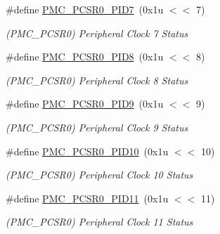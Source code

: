 \begin{DoxyCompactItemize}
\mbox{\label{group__SAMV71__PMC_gaf0489b06cf0cb06ef115099fdf56fc3e}} 
\#define \mbox{\hyperlink{group__SAMV71__PMC_gaf0489b06cf0cb06ef115099fdf56fc3e}{P\+M\+C\+\_\+\+P\+C\+S\+R0\+\_\+\+P\+I\+D7}}~(0x1u $<$$<$ 7)
\begin{DoxyCompactList}\small\item\em (P\+M\+C\+\_\+\+P\+C\+S\+R0) Peripheral Clock 7 Status \end{DoxyCompactList}\item 
\mbox{\label{group__SAMV71__PMC_gaaa314397c89a5ab032c464267b2d99ed}} 
\#define \mbox{\hyperlink{group__SAMV71__PMC_gaaa314397c89a5ab032c464267b2d99ed}{P\+M\+C\+\_\+\+P\+C\+S\+R0\+\_\+\+P\+I\+D8}}~(0x1u $<$$<$ 8)
\begin{DoxyCompactList}\small\item\em (P\+M\+C\+\_\+\+P\+C\+S\+R0) Peripheral Clock 8 Status \end{DoxyCompactList}\item 
\mbox{\label{group__SAMV71__PMC_ga2211d038ad027c64e82e69ff1ee493b1}} 
\#define \mbox{\hyperlink{group__SAMV71__PMC_ga2211d038ad027c64e82e69ff1ee493b1}{P\+M\+C\+\_\+\+P\+C\+S\+R0\+\_\+\+P\+I\+D9}}~(0x1u $<$$<$ 9)
\begin{DoxyCompactList}\small\item\em (P\+M\+C\+\_\+\+P\+C\+S\+R0) Peripheral Clock 9 Status \end{DoxyCompactList}\item 
\mbox{\label{group__SAMV71__PMC_gae545f7dc0353b4cf88af68fa9485ef68}} 
\#define \mbox{\hyperlink{group__SAMV71__PMC_gae545f7dc0353b4cf88af68fa9485ef68}{P\+M\+C\+\_\+\+P\+C\+S\+R0\+\_\+\+P\+I\+D10}}~(0x1u $<$$<$ 10)
\begin{DoxyCompactList}\small\item\em (P\+M\+C\+\_\+\+P\+C\+S\+R0) Peripheral Clock 10 Status \end{DoxyCompactList}\item 
\mbox{\label{group__SAMV71__PMC_ga50a5281db7e153aba3eb684fa9ed8c08}} 
\#define \mbox{\hyperlink{group__SAMV71__PMC_ga50a5281db7e153aba3eb684fa9ed8c08}{P\+M\+C\+\_\+\+P\+C\+S\+R0\+\_\+\+P\+I\+D11}}~(0x1u $<$$<$ 11)
\begin{DoxyCompactList}\small\item\em (P\+M\+C\+\_\+\+P\+C\+S\+R0) Peripheral Clock 11 Status \end{DoxyCompactList}\item 
$$
\end{DoxyCompactItemize}

